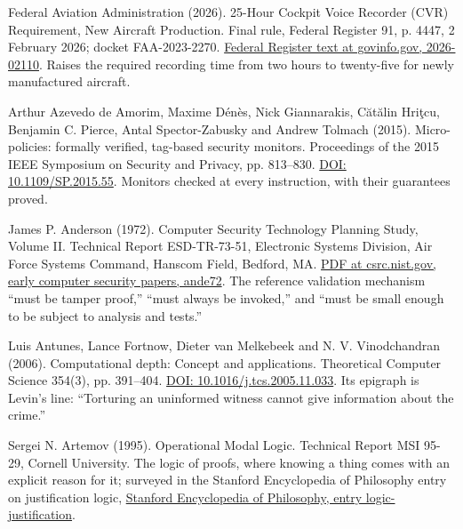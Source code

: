 \documentclass[11pt,twoside]{article}
\theoremstyle{thielethm}
\theoremstyle{thieledef}
\theoremstyle{thieledef}
\theoremstyle{thieledef}
\theoremstyle{thielethm}
\theoremstyle{thieleobs}
\theoremstyle{thielethm}
\begin{document}
\noindent Federal Aviation Administration (2026). 25-Hour Cockpit Voice Recorder (CVR) Requirement, New Aircraft Production. Final rule, Federal Register 91, p. 4447, 2 February 2026; docket FAA-2023-2270. \href{https://www.govinfo.gov/content/pkg/FR-2026-02-02/html/2026-02110.htm}{Federal Register text at govinfo.gov, 2026-02110}. Raises the required recording time from two hours to twenty-five for newly manufactured aircraft.
\par\medskip

\noindent Arthur Azevedo de Amorim, Maxime D\'en\`es, Nick Giannarakis, C\u{a}t\u{a}lin Hri\c{t}cu, Benjamin C. Pierce, Antal Spector-Zabusky and Andrew Tolmach (2015). Micro-policies: formally verified, tag-based security monitors. Proceedings of the 2015 IEEE Symposium on Security and Privacy, pp. 813--830. \href{https://doi.org/10.1109/SP.2015.55}{DOI: 10.1109/SP.2015.55}. Monitors checked at every instruction, with their guarantees proved.
\par\medskip

\noindent James P. Anderson (1972). Computer Security Technology Planning Study, Volume II. Technical Report ESD-TR-73-51, Electronic Systems Division, Air Force Systems Command, Hanscom Field, Bedford, MA. \href{https://csrc.nist.gov/csrc/media/publications/conference-paper/1998/10/08/proceedings-of-the-21st-nissc-1998/documents/early-cs-papers/ande72.pdf}{PDF at csrc.nist.gov, early computer security papers, ande72}. The reference validation mechanism ``must be tamper proof,'' ``must always be invoked,'' and ``must be small enough to be subject to analysis and tests.''
\par\medskip

\noindent Luis Antunes, Lance Fortnow, Dieter van Melkebeek and N. V. Vinodchandran (2006). Computational depth: Concept and applications. Theoretical Computer Science 354(3), pp. 391--404. \href{https://doi.org/10.1016/j.tcs.2005.11.033}{DOI: 10.1016/j.tcs.2005.11.033}. Its epigraph is Levin's line: ``Torturing an uninformed witness cannot give information about the crime.''
\par\medskip

\noindent Sergei N. Artemov (1995). Operational Modal Logic. Technical Report MSI 95-29, Cornell University. The logic of proofs, where knowing a thing comes with an explicit reason for it; surveyed in the Stanford Encyclopedia of Philosophy entry on justification logic, \href{https://plato.stanford.edu/entries/logic-justification/}{Stanford Encyclopedia of Philosophy, entry logic-justification}.
\par\medskip
\end{document}
